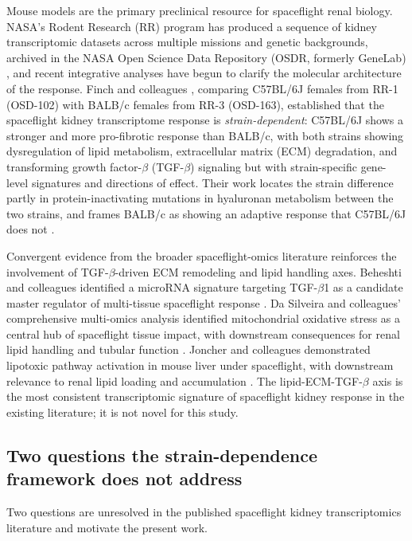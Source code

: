 \documentclass[11pt]{article}
\begin{document}
Mouse models are the primary preclinical resource for spaceflight renal biology. NASA's Rodent Research (RR) program has produced a sequence of kidney transcriptomic datasets across multiple missions and genetic backgrounds, archived in the NASA Open Science Data Repository (OSDR, formerly GeneLab) \citep{ray2019genelab}, and recent integrative analyses have begun to clarify the molecular architecture of the response. Finch and colleagues \citep{finch2025strain}, comparing C57BL/6J females from RR-1 (OSD-102) with BALB/c females from RR-3 (OSD-163), established that the spaceflight kidney transcriptome response is \emph{strain-dependent}: C57BL/6J shows a stronger and more pro-fibrotic response than BALB/c, with both strains showing dysregulation of lipid metabolism, extracellular matrix (ECM) degradation, and transforming growth factor-$\beta$ (TGF-$\beta$) signaling but with strain-specific gene-level signatures and directions of effect. Their work locates the strain difference partly in protein-inactivating mutations in hyaluronan metabolism between the two strains, and frames BALB/c as showing an adaptive response that C57BL/6J does not \citep{finch2025strain}.

Convergent evidence from the broader spaceflight-omics literature reinforces the involvement of TGF-$\beta$-driven ECM remodeling and lipid handling axes. Beheshti and colleagues identified a microRNA signature targeting TGF-$\beta$1 as a candidate master regulator of multi-tissue spaceflight response \citep{beheshti2018microrna}. Da Silveira and colleagues' comprehensive multi-omics analysis identified mitochondrial oxidative stress as a central hub of spaceflight tissue impact, with downstream consequences for renal lipid handling and tubular function \citep{daSilveira2020comprehensive}. Joncher and colleagues demonstrated lipotoxic pathway activation in mouse liver under spaceflight, with downstream relevance to renal lipid loading and accumulation \citep{joncher2016spaceflight, proctor2006regulation}. The lipid-ECM-TGF-$\beta$ axis is the most consistent transcriptomic signature of spaceflight kidney response in the existing literature; it is not novel for this study.

\subsection{Two questions the strain-dependence framework does not address}

Two questions are unresolved in the published spaceflight kidney transcriptomics literature and motivate the present work.
\end{document}
